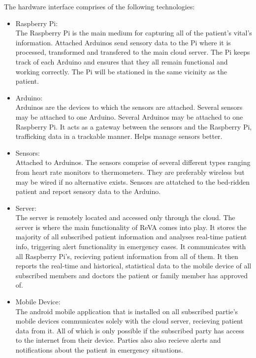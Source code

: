 The hardware interface comprises of the following technologies: 
\begin{itemize}
\item{Raspberry Pi:\\The Raspberry Pi is the main medium for capturing all of the patient's vital's information. Attached Arduinos send sensory data
to the Pi where it is processed, transformed and transfered to the main cloud server. The Pi keeps track of each Arduino and ensures that they all remain 
functional and working correctly. The Pi will be stationed in the same vicinity as the patient.}
\item{Arduino:\\ Arduinos are the devices to which the sensors are attached. Several sensors may be attached to one Arduino. Several
Arduinos may be attached to one Raspberry Pi. It acts as a gateway between the sensors and the Raspberry Pi, trafficking data in a 
trackable manner. Helps manage sensors better.}
\item{Sensors:\\ Attached to Arduinos. The sensors comprise of several different types ranging from heart rate monitors to thermometers. They are 
preferably wireless but may be wired if no alternative exists. Sensors are attatched to the bed-ridden patient and report sensory data to the Arduino.}
\item{Server:\\ The server is remotely located and accessed only through the cloud. The server is where the main functionality of ReVA comes into play. 
It stores the majority of all subscribed patient information and analyses real-time patient info, triggering alert functionality in emergency cases. It 
communicates with all Raspberry Pi's, recieving patient information from all of them. It then reports the real-time and historical, statistical data to the mobile device of all 
subscribed members and doctors the patient or family member has approved of.} 
\item{Mobile Device:\\ The android mobile application that is installed on all subscribed partie's mobile devices communicates solely with the cloud server,
recieving patient data from it. All of which is only possible if the subscribed party has access to the internet from their device. Parties also 
also recieve alerts and notifications about the patient in emergency situations.}
\end{itemize}
